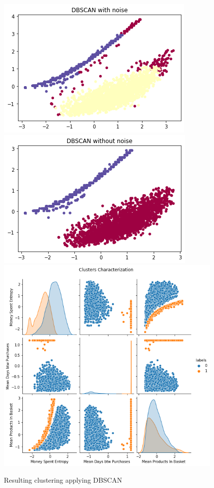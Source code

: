 \documentclass[12pt]{article}
\begin{document}
\begin{figure}[!h]
  \includegraphics[scale=0.4]{images/DBSCAN_3_with.png}
\endminipage\hfill
{}
  \includegraphics[scale=0.4]{images/DBSCAN_3_without.png}
\endminipage\hfill
{}
    \includegraphics[scale=0.3]{images/figure_dbscan_clusters_characterization.png}
    \endminipage\hfill
\caption{Resulting clustering applying DBSCAN }
\label{fig:dbscan_3}
\end{figure}
\end{document}
